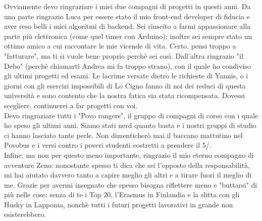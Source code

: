 {  Ovviamente devo ringraziare i miei due compagni di progetti in questi anni. Da una parte ringrazio Luca per essere stato il mio front-end developer di fiducia e aver reso belli i miei algoritmi di backend. Sei riuscito a farmi appassionare alla parte più elettronica (come quel timer con Arduino); inoltre sei sempre stato un ottimo amico a cui raccontare le mie vicende di vita. Certo, pensi troppo a "fatturare", ma ti si vuole bene proprio perchè sei così. Dall'altra ringrazio "il Debo" (perchè chiamarti Andrea mi fa troppo strano), con il quale ho condiviso gli ultimi progetti ed esami. Le lacrime versate dietro le richieste di Yannis, o i giorni con gli esercizi impossibili di Lo Cigno fanno di noi dei reduci di questa università e sono contento che la nostra fatica sia stata ricompensata. Dovessi scegliere, continuerei a far progetti con voi. \\
  Devo ringraziare tutti i "Povo rangers", il gruppo di compagni di corso con i quale ho speso gli ultimi anni. Siamo stati nerd quanto basta e i nostri gruppi di studio ci hanno lasciato tante perle. Non dimenticherò mai il baccano mattutino nel Povobus e i versi contro i poveri studenti costretti a prendere il 5/. \\
  Infine, ma non per questo meno importante, ringrazio il mio eterno compagno di avventure Zeno: nonostante spesso ti dica che sei l'opposto della responsabilità, mi hai aiutato davvero tanto a capire meglio gli altri e a tirare fuori il meglio di me. Grazie per avermi insegnato che spesso bisogna riflettere meno e "buttarsi" di più nelle cose: senza di te i Top 20, l'Erasmus in Finlandia e la slitta con gli Husky in Lapponia, nonchè tutti i futuri progetti lavorativi in grande non esisterebbero. 
}
